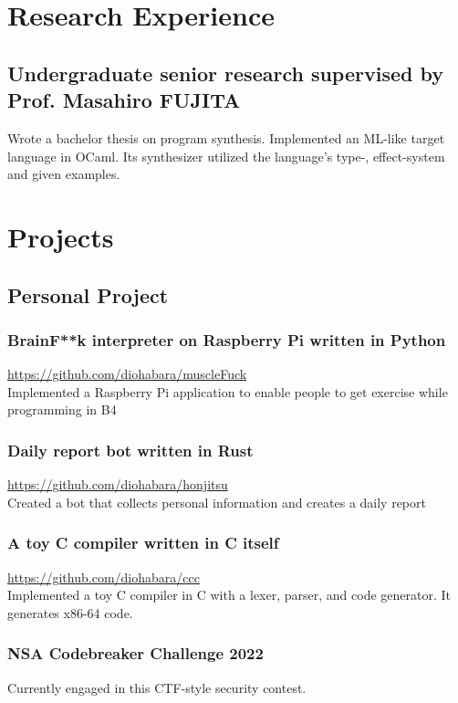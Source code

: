 \documentclass[10pt]{article}
\begin{document}
\section*{Research Experience}
  \subsection*{Undergraduate senior research supervised by Prof. Masahiro FUJITA}
    Wrote a bachelor thesis on program synthesis.
    Implemented an ML-like target language in OCaml.
    Its synthesizer utilized the language's type-, effect-system and given examples.

\section*{Projects}
  \begin{multicols}{2}
  \subsection*{Personal Project}
    \subsubsection*{BrainF**k interpreter on Raspberry Pi written in Python}
       \href{https://github.com/diohabara/muscleFuck}{https://github.com/diohabara/muscleFuck}
      \\Implemented a Raspberry Pi application to enable people to get exercise while programming in B4
    \subsubsection*{Daily report bot written in Rust}
       \href{https://github.com/diohabara/honjitsu}{https://github.com/diohabara/honjitsu}
      \\Created a bot that collects personal information and creates a daily report
    \subsubsection*{A toy C compiler written in C itself}
       \href{https://github.com/diohabara/ccc}{https://github.com/diohabara/ccc}
      \\Implemented a toy C compiler in C with a lexer, parser, and code generator.
      It generates x86-64 code.
    \subsubsection*{NSA Codebreaker Challenge 2022}
      Currently engaged in this CTF-style security contest.


\end{multicols}
\end{document}
